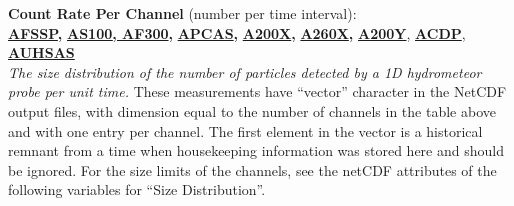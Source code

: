 \begin{hangparagraphs}
\textbf{Count Rate Per Channel }(number per time interval):\textbf{\uline{\label{punch:5-4}\label{punch:5-7}}}\hypertarget{AFSSP}{}\hypertarget{AS100}{}\hypertarget{AF300}{}\hypertarget{APCAS}{}\hypertarget{A200X}{}\hypertarget{A260X}{}\hypertarget{A200Y}{}\hypertarget{ACDP}{}\hypertarget{AUHSAS}{}\textbf{\uline{}}\\
\textbf{\uline{AFSSP}}\textbf{,
}\textbf{\uline{AS100}}\textbf{\uline{,
AF300}}\textbf{, }\textbf{\uline{APCAS}}\textbf{,
}\textbf{\uline{A200X}}\textbf{,
}\textbf{\uline{A260X}}\textbf{,
}\textbf{\uline{A200Y}}, \textbf{\uline{ACDP}},
\textbf{\uline{AUHSAS}}\\
\emph{The size distribution of the number of particles detected by
a 1D hydrometeor probe per unit time.} These measurements have ``vector''
character in the NetCDF output files, with dimension
equal to the number of channels in the table above and with one entry
per channel. The first element in the vector is a historical remnant
from a time when housekeeping information was stored here and should
be ignored. For the size limits of the channels, see the netCDF attributes
of the following variables for ``Size Distribution''.


\end{hangparagraphs}
